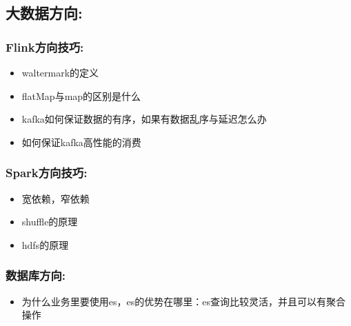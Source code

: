 \documentclass[11pt]{article}
\begin{document}
\subsection{大数据方向:}
\label{sec-6-6}

\subsubsection{Flink方向技巧:}
\label{sec-6-6-1}
\begin{itemize}
\item waltermark的定义
\item flatMap与map的区别是什么
\item kafka如何保证数据的有序，如果有数据乱序与延迟怎么办
\item 如何保证kafka高性能的消费
\end{itemize}

\subsubsection{Spark方向技巧:}
\label{sec-6-6-2}
\begin{itemize}
\item 宽依赖，窄依赖
\item shuffle的原理
\item hdfs的原理
\end{itemize}

\subsubsection{数据库方向:}
\label{sec-6-6-3}
\begin{itemize}
\item 为什么业务里要使用es，es的优势在哪里：es查询比较灵活，并且可以有聚合操作
\end{itemize}
\end{document}
